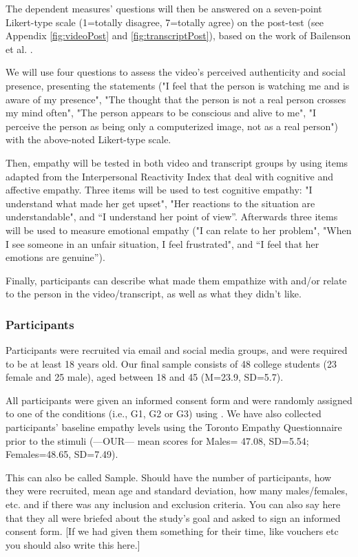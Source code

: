 The dependent measures' questions will then be answered on a seven-point Likert-type scale (1=totally disagree, 7=totally agree) on the post-test (see Appendix \ref{fig:videoPost} and \ref{fig:transcriptPost}), based on the work of Bailenson et al. \cite{BAI03}.

We will use four questions to assess the video's perceived authenticity and social presence, presenting the statements ("I feel that the person is watching me and is aware of my presence", "The thought that the person is not a real person crosses my mind often", "The person appears to be conscious and alive to me", "I perceive the person as being only a computerized image, not as a real person") with the above-noted Likert-type scale.

Then, empathy will be tested in both video and transcript groups by using items adapted from the Interpersonal Reactivity Index \cite{DAV83} that deal with cognitive and affective empathy. Three items will be used to test cognitive empathy: "I understand what made her get upset", "Her reactions to the situation are understandable", and “I understand her point of view”. Afterwards three items will be used to measure emotional empathy ("I can relate to her problem", "When I see someone in an unfair situation, I feel frustrated", and “I feel that her emotions are genuine”).

Finally, participants can describe what made them empathize with and/or relate to the person in the video/transcript, as well as what they didn't like.

\subsubsection{Participants}
Participants were recruited via email and social media groups, and were required to be at least 18 years old. Our final sample consists of 48 college students (23 female and 25 male), aged between 18 and 45 (M=23.9, SD=5.7). 

All participants were given an informed consent form and were randomly assigned to one of the conditions (i.e., G1, G2 or G3) using \cite{ALLOCATE.MONSTER}. We have also collected participants' baseline empathy levels using the Toronto Empathy Questionnaire \cite{} prior to the stimuli (---OUR--- mean scores for Males= 47.08, SD=5.54; Females=48.65, SD=7.49).


This can also be called Sample. Should have the number of participants, how they were recruited, mean age and standard deviation, how many males/females, etc. and if there was any inclusion and exclusion criteria.
You can also say here that they all were briefed about the study's goal and asked to sign an informed consent form. [If we had given them something for their time, like vouchers etc you should also write this here.]

